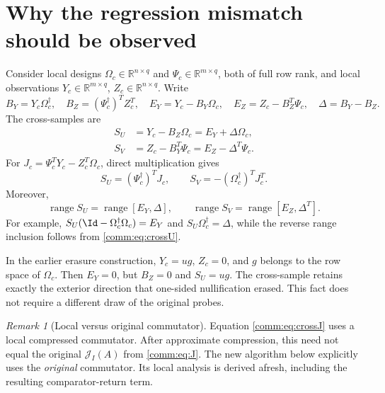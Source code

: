 \documentclass[11pt,oneside,openany,a4paper]{book}
\numberwithin{equation}{chapter}
\theoremstyle{definition}
\theoremstyle{remark}
\newtheorem{remark}[theorem]{Remark}
\newcommand{\R}{\mathbb R}\newcommand{\E}{\mathbb E}\newcommand{\Prb}{\mathbb P}\newcommand{\PP}{\mathbb P}
\DeclareMathOperator{\ran}{range}\DeclareMathOperator{\OPT}{OPT}
\newcommand{\J}{\mathcal J}\newcommand{\transpose}{\mathsf T}
\begin{document}
\section{Why the regression mismatch should be observed}
Consider local designs $\Omega_c\in\R^{n\times q}$ and $\Psi_c\in\R^{m\times q}$, both of full row rank, and local observations $Y_c\in\R^{m\times q}$, $Z_c\in\R^{n\times q}$. Write
\[
 B_Y=Y_c\Omega_c^\dagger,\quad B_Z=(\Psi_c^\dagger)^T Z_c^T,
 \quad E_Y=Y_c-B_Y\Omega_c,\quad E_Z=Z_c-B_Z^T\Psi_c,
 \quad\Delta=B_Y-B_Z.
\]
The cross-samples are
\begin{align}
 S_U&=Y_c-B_Z\Omega_c=E_Y+\Delta\Omega_c,\label{comm:eq:crossU}\\
 S_V&=Z_c-B_Y^T\Psi_c=E_Z-\Delta^T\Psi_c.\label{comm:eq:crossV}
\end{align}
For $J_c=\Psi_c^TY_c-Z_c^T\Omega_c$, direct multiplication gives
\begin{equation}\label{comm:eq:crossJ}
 S_U=(\Psi_c^\dagger)^TJ_c,\qquad
 S_V=-(\Omega_c^\dagger)^TJ_c^T.
\end{equation}
Moreover,
\begin{equation}\label{comm:eq:crossrange}
 \ran S_U=\ran[E_Y,\Delta],\qquad
 \ran S_V=\ran[E_Z,\Delta^T].
\end{equation}
For example, $S_U(\Id-\Omega_c^\dagger\Omega_c)=E_Y$ and $S_U\Omega_c^\dagger=\Delta$, while the reverse range inclusion follows from \eqref{comm:eq:crossU}.

In the earlier erasure construction, $Y_c=u g$, $Z_c=0$, and $g$ belongs to the row space of $\Omega_c$. Then $E_Y=0$, but $B_Z=0$ and $S_U=u g$. The cross-sample retains exactly the exterior direction that one-sided nullification erased. This fact does not require a different draw of the original probes.

\begin{remark}[Local versus original commutator]
Equation \eqref{comm:eq:crossJ} uses a local compressed commutator. After approximate compression, this need not equal the original $\J_I(A)$ from \eqref{comm:eq:J}. The new algorithm below explicitly uses the \emph{original} commutator. Its local analysis is derived afresh, including the resulting comparator-return term.
\end{remark}
\end{document}
